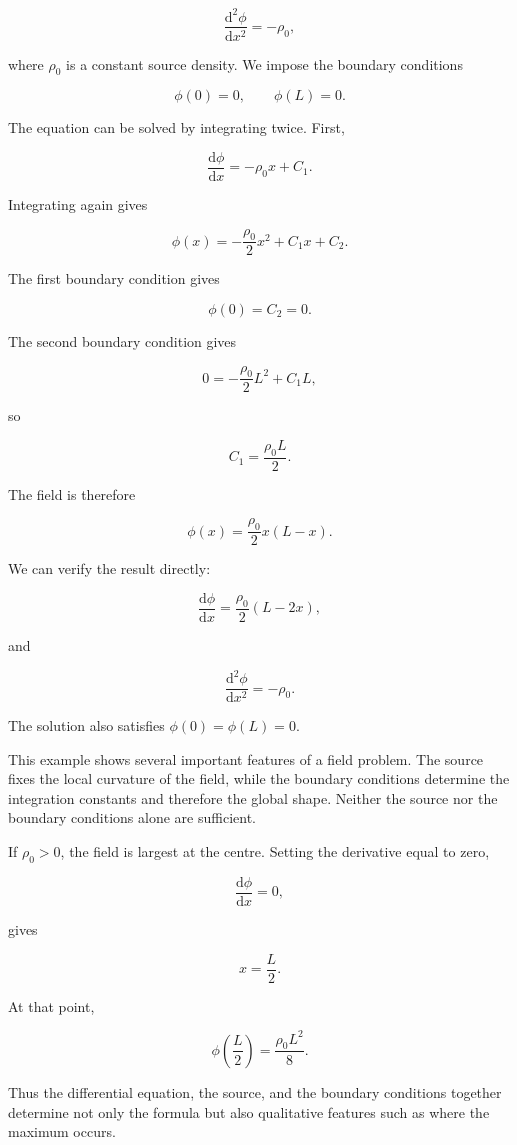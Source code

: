 \[
\frac{\mathrm{d}^{2}\phi}{\mathrm{d}x^{2}}
=
-\rho_{0},
\]

where \(\rho_{0}\) is a constant source density. We impose the boundary conditions

\[
\phi(0)=0,
\qquad
\phi(L)=0.
\]

The equation can be solved by integrating twice. First,

\[
\frac{\mathrm{d}\phi}{\mathrm{d}x}
=
-\rho_{0}x+C_{1}.
\]

Integrating again gives

\[
\phi(x)
=
-\frac{\rho_{0}}{2}x^{2}
+C_{1}x
+C_{2}.
\]

The first boundary condition gives

\[
\phi(0)=C_{2}=0.
\]

The second boundary condition gives

\[
0
=
-\frac{\rho_{0}}{2}L^{2}
+C_{1}L,
\]

so

\[
C_{1}=\frac{\rho_{0}L}{2}.
\]

The field is therefore

\[
\boxed{
\phi(x)
=
\frac{\rho_{0}}{2}x(L-x)
}.
\]

We can verify the result directly:

\[
\frac{\mathrm{d}\phi}{\mathrm{d}x}
=
\frac{\rho_{0}}{2}(L-2x),
\]

and

\[
\frac{\mathrm{d}^{2}\phi}{\mathrm{d}x^{2}}
=
-\rho_{0}.
\]

The solution also satisfies \(\phi(0)=\phi(L)=0\).

This example shows several important features of a field problem. The source fixes the local curvature of the field, while the boundary conditions determine the integration constants and therefore the global shape. Neither the source nor the boundary conditions alone are sufficient.

If \(\rho_{0}>0\), the field is largest at the centre. Setting the derivative equal to zero,

\[
\frac{\mathrm{d}\phi}{\mathrm{d}x}=0,
\]

gives

\[
x=\frac{L}{2}.
\]

At that point,

\[
\phi\left(\frac{L}{2}\right)
=
\frac{\rho_{0}L^{2}}{8}.
\]

Thus the differential equation, the source, and the boundary conditions together determine not only the formula but also qualitative features such as where the maximum occurs.

